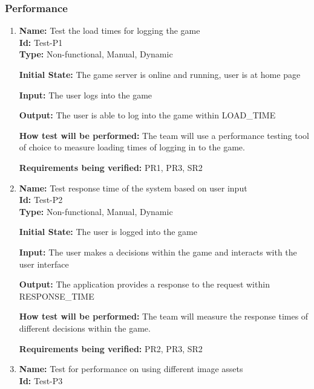 \documentclass[12pt, titlepage]{article}
\begin{document}
\subsubsection{Performance}
\begin{enumerate}
    \item{\textbf{Name: }Test the load times for logging the game\\}\label{Test-P1}
    \textbf{Id: }Test-P1\\
    
    \textbf{Type:} Non-functional, Manual, Dynamic
    					
    \textbf{Initial State: }The game server is online and running, user is at home page
    					
    \textbf{Input:} The user logs into the game
    					
   \textbf{Output: }The user is able to log into the game within LOAD\_TIME
    					
   \textbf{How test will be performed:} The team will use a performance testing tool of choice to measure loading times of logging in to the game.
   
   \textbf{Requirements being verified:} PR1, PR3, SR2
    
    
    \item{\textbf{Name: }Test response time of the system based on user input\\}\label{Test-P2}
     \textbf{Id: }Test-P2\\
    
    \textbf{Type: }Non-functional, Manual, Dynamic
    					
    \textbf{Initial State:} The user is logged into the game
    					
    \textbf{Input:} The user makes a decisions within the game and interacts with the user interface
    					
    \textbf{Output:} The application provides a response to the request within RESPONSE\_TIME
    					
    \textbf{How test will be performed:} The team will measure the response times of different decisions within the game.
    
    \textbf{Requirements being verified:} PR2, PR3, SR2


\item{\textbf{Name:} Test for performance on using different image assets \\}\label{Test-P3}
\textbf{Id: }Test-P3\\


\end{enumerate}
\end{document}
